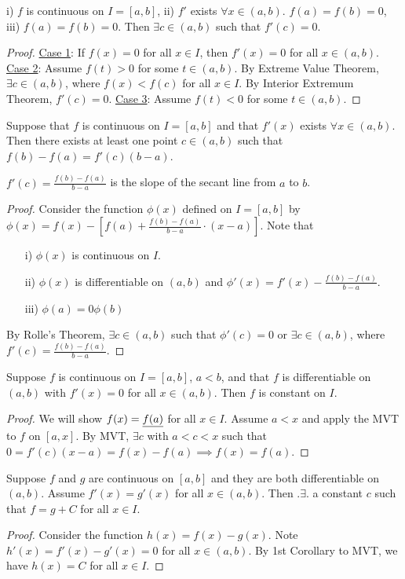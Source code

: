\documentclass[]{article}
\begin{document}

\begin{recall}
	 i) $f$ is continuous on $I = [a,b]$, ii) $f'$ exists $\forall x \in (a,b)$. $f(a) = f(b) = 0$, iii) \ul{$f(a) = f(b) = 0$}. Then $\exists c\in (a,b)$ such that $f'(c) = 0$.
\end{recall}
\begin{proof}
	\ul{Case 1}: If $f(x) = 0$ for all $x\in I$, then $f'(x) = 0$ for all $x\in (a,b)$. 
	\ul{Case 2}: Assume \ul{$f(t) >0$} for some $t \in(a,b)$. By Extreme Value Theorem, \ul{$\exists c\in (a,b)$}, where $f(x) < f(c)$ for all $x\in I$. 
	By Interior Extremum Theorem, $f'(c) = 0$.
	\ul{Case 3}: Assume $f(t) < 0$ for some $t\in (a,b)$. 
\end{proof}
\begin{theorem}
	 Suppose that $f$ is continuous on $I = [a,b]$ and that $f'(x)$ exists $\forall x\in (a,b)$. Then there exists at least one point $c \in (a,b)$ such that $f(b)-f(a) = f'(c)(b-a)$.
\end{theorem}
\begin{note}
	$f'(c) = \frac{f(b)-f(a)}{b-a}$ is the slope of the secant line from $a$ to $b$.
\end{note}
\begin{proof}
	Consider the function $\phi(x)$ defined on $I = [a,b]$ by $\phi(x) = f(x) - \left[ f(a) + \frac{f(b)-f(a)}{b-a}\cdot(x-a) \right]$. Note that 
	\begin{enumerate}
		\item[i)] $\phi(x)$ is continuous on $I$. 
		\item[ii)] $\phi(x)$ is differentiable on $(a,b)$ and $\phi'(x) = f'(x) - \frac{f(b)-f(a)}{b-a}$. 
		\item[iii)] $\phi(a) = 0 \phi(b)$
	\end{enumerate}
	By Rolle's Theorem, $\exists c \in(a,b)$ such that $\phi'(c) = 0$ or $\exists c\in (a,b)$, where $f'(c) = \frac{f(b)-f(a)}{b-a}$.
\end{proof}
\begin{corollary}
	 Suppose $f$ is continuous on $I = [a,b]$, $a<b$, and that $f$ is differentiable on $(a,b)$ with $f'(x) = 0$ for all $x\in(a,b)$. Then $f$ is constant on $I$. 
\end{corollary}
\begin{proof}
	We will show $f(x) = \underline{f(a)}$ for all $x\in I$. Assume $a< x$ and apply the MVT to $f$ on $[a,x]$. By MVT, $\exists c$ with $a<c<x$ such that $0 = f'(c) (x-a) = f(x) - f(a) \implies f(x) = f(a)$. 
\end{proof}
\begin{corollary}
	 Suppose $f$ and $g$ are continuous on $[a,b]$ and they are both differentiable on $(a,b)$. Assume $f'(x) = g'(x)$ for all $x\in(a,b)$. Then .$\exists$. a constant $c$ such that $f = g+C$ for all $x\in I$.
\end{corollary}
\begin{proof}
	Consider the function $h(x) = f(x) - g(x)$. Note $h'(x) = f'(x) - g'(x) = 0$ for all $x\in(a,b)$. By 1st Corollary to MVT, we have $h(x) = C$ for all  $x\in I$.
\end{proof}
\end{document}
